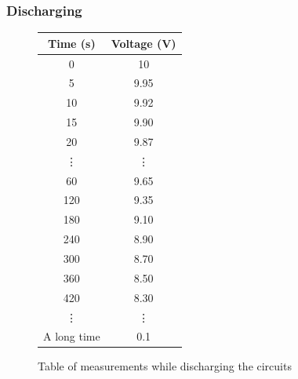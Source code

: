 \documentclass[a4paper]{article}
\begin{document}
\subsubsection{Discharging}

\begin{figure}[H]
    \centering
    \begin{tabular}{|c|c|}
        \hline
        Time (s) & Voltage (V)\\
        \hline
        0 & 10\\
        5 & 9.95\\
        10 & 9.92\\
        15 & 9.90\\
        20 & 9.87\\
        \vdots & \vdots\\
        60 & 9.65\\
        120 & 9.35\\
        180 & 9.10\\
        240 & 8.90\\
        300 & 8.70\\
        360 & 8.50\\
        420 & 8.30\\
        \vdots & \vdots\\
        A long time & 0.1\\
        \hline   
    \end{tabular}
\caption{Table of measurements while discharging the circuits}
\end{figure}
\end{document}
